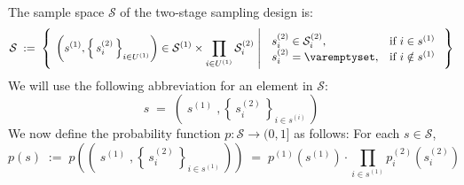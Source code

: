 \vskip 0.3cm
\noindent
The sample space $\mathcal{S}$ of the two-stage sampling design is:
\begin{equation*}
\mathcal{S}
\;:=\;
\left\{\;
\left.\left(s^{(1)},\left\{\,s^{(2)}_{i}\,\right\}_{i\in U^{(1)}}\right) \in \mathcal{S}^{(1)} \times \prod_{i \in U^{(1)}}\mathcal{S}^{(2)}_{i}\;\right\vert\;
\begin{array}{ll}
s^{(2)}_{i} \in \mathcal{S}^{(2)}_{i}, &\textnormal{if $i \in s^{(1)}$}
\\
s^{(2)}_{i} = \varemptyset, & \textnormal{if $i \notin s^{(1)}$}
\end{array}
\;\right\}
\end{equation*}
We will use the following abbreviation for an element in $\mathcal{S}$:
\begin{equation*}
s \;=\; \left(\;s^{(1)}\;,\left\{\,s^{(2)}_{i}\,\right\}_{i \in s^{(i)}}\,\right)
\end{equation*}
We now define the probability function $p : \mathcal{S} \longrightarrow (0,1]$ as follows:
For each $s \in \mathcal{S}$,
\begin{equation}
\label{twoStageSampleProbability}
p(s)
\;:=\; p\left(\left(\;s^{(1)}\;,\left\{\,s^{(2)}_{i}\,\right\}_{i \in s^{(1)}}\,\right)\right)
\;=\; p^{(1)}\!\left(s^{(1)}\right)\cdot\prod_{i\in s^{(1)}}p^{(2)}_{i}\!\left(s^{(2)}_{i}\right)
\end{equation}

